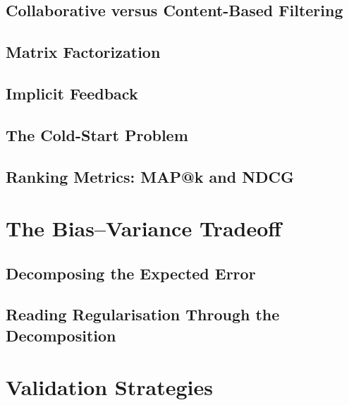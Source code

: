 
\subsection{Collaborative versus Content-Based Filtering}

\subsection{Matrix Factorization}

\subsection{Implicit Feedback}

\subsection{The Cold-Start Problem}

\subsection{Ranking Metrics: MAP@k and NDCG}

\section{The Bias--Variance Tradeoff}
\label{sec:bias-variance}

\subsection{Decomposing the Expected Error}


\subsection{Reading Regularisation Through the Decomposition}

\section{Validation Strategies}
\label{sec:validation}

